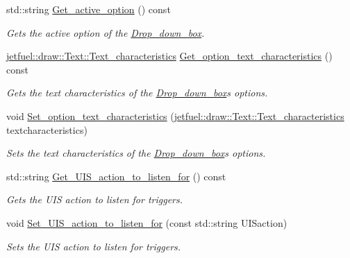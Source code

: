 \begin{DoxyCompactItemize}
std\+::string \hyperlink{classjetfuel_1_1gui_1_1Drop__down__box_ae53f93bddf6764775454246efa7d7e57}{Get\+\_\+active\+\_\+option} () const
\begin{DoxyCompactList}\small\item\em Gets the active option of the \hyperlink{classjetfuel_1_1gui_1_1Drop__down__box}{Drop\+\_\+down\+\_\+box}. \end{DoxyCompactList}\item 
\hyperlink{structjetfuel_1_1draw_1_1Text_1_1Text__characteristics}{jetfuel\+::draw\+::\+Text\+::\+Text\+\_\+characteristics} \hyperlink{classjetfuel_1_1gui_1_1Drop__down__box_a8f8bd91ea279110cab98b78854207ae7}{Get\+\_\+option\+\_\+text\+\_\+characteristics} () const
\begin{DoxyCompactList}\small\item\em Gets the text characteristics of the \hyperlink{classjetfuel_1_1gui_1_1Drop__down__box}{Drop\+\_\+down\+\_\+box}\textquotesingle{}s options. \end{DoxyCompactList}\item 
void \hyperlink{classjetfuel_1_1gui_1_1Drop__down__box_a051d83177f8fa26325dcbdc504ccb0a9}{Set\+\_\+option\+\_\+text\+\_\+characteristics} (\hyperlink{structjetfuel_1_1draw_1_1Text_1_1Text__characteristics}{jetfuel\+::draw\+::\+Text\+::\+Text\+\_\+characteristics} textcharacteristics)
\begin{DoxyCompactList}\small\item\em Sets the text characteristics of the \hyperlink{classjetfuel_1_1gui_1_1Drop__down__box}{Drop\+\_\+down\+\_\+box}\textquotesingle{}s options. \end{DoxyCompactList}\item 
std\+::string \hyperlink{classjetfuel_1_1gui_1_1Drop__down__box_a8de320a3db8d94d9b0846e6ae33e261c}{Get\+\_\+\+U\+I\+S\+\_\+action\+\_\+to\+\_\+listen\+\_\+for} () const
\begin{DoxyCompactList}\small\item\em Gets the U\+IS action to listen for triggers. \end{DoxyCompactList}\item 
void \hyperlink{classjetfuel_1_1gui_1_1Drop__down__box_acb6540d9d5230dae1a9e3ecaf6949708}{Set\+\_\+\+U\+I\+S\+\_\+action\+\_\+to\+\_\+listen\+\_\+for} (const std\+::string U\+I\+Saction)
\begin{DoxyCompactList}\small\item\em Sets the U\+IS action to listen for triggers. \end{DoxyCompactList}\item 

\end{DoxyCompactItemize}
